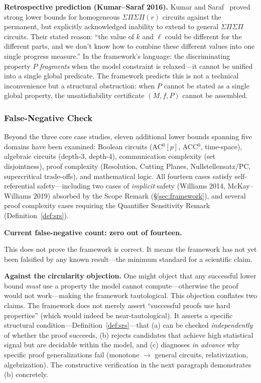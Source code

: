 \documentclass[11pt,a4paper]{article}
\theoremstyle{plain}
\theoremstyle{definition}
\theoremstyle{remark}
\begin{document}
\textbf{Retrospective prediction (Kumar--Saraf 2016).} Kumar and Saraf~\cite{KumarSaraf2016} proved strong lower bounds for homogeneous $\Sigma\Pi\Sigma\Pi(r)$ circuits against the permanent, but explicitly acknowledged inability to extend to general $\Sigma\Pi\Sigma\Pi$ circuits. Their stated reason: ``the value of $k$ and $\ell$ could be different for the different parts, and we don't know how to combine these different values into one single progress measure.'' In the framework's language: the discriminating property $P$ \emph{fragments} when the model constraint is relaxed---it cannot be unified into a single global predicate. The framework predicts this is not a technical inconvenience but a structural obstruction: when $P$ cannot be stated as a single global property, the unsatisfiability certificate $(M, f, P)$ cannot be assembled.

\subsubsection{False-Negative Check}

Beyond the three core case studies, eleven additional lower bounds spanning five domains have been examined: Boolean circuits (AC$^0[p]$, ACC$^0$, time-space), algebraic circuits (depth-3, depth-4), communication complexity (set disjointness), proof complexity (Resolution, Cutting Planes, Nullstellensatz/PC, supercritical trade-offs), and mathematical logic. All fourteen cases satisfy self-referential safety---including two cases of \emph{implicit} safety (Williams 2014, McKay--Williams 2019) absorbed by the Scope Remark (\S\ref{sec:framework}), and several proof complexity cases requiring the Quantifier Sensitivity Remark (Definition~\ref{def:srs}).

\textbf{Current false-negative count: zero out of fourteen.}

This does not prove the framework is correct. It means the framework has not yet been falsified by any known result---the minimum standard for a scientific claim.

\textbf{Against the circularity objection.} One might object that any successful lower bound \emph{must} use a property the model cannot compute---otherwise the proof would not work---making the framework tautological. This objection conflates two claims. The framework does not merely assert ``successful proofs use hard properties'' (which would indeed be near-tautological). It asserts a specific structural condition---Definition~\ref{def:srs}---that (a) can be checked \emph{independently} of whether the proof succeeds, (b) rejects candidates that achieve high statistical signal but are decidable within the model, and (c) diagnoses \emph{in advance} why specific proof generalizations fail (monotone $\to$ general circuits, relativization, algebrization). The constructive verification in the next paragraph demonstrates (b) concretely.
\end{document}

